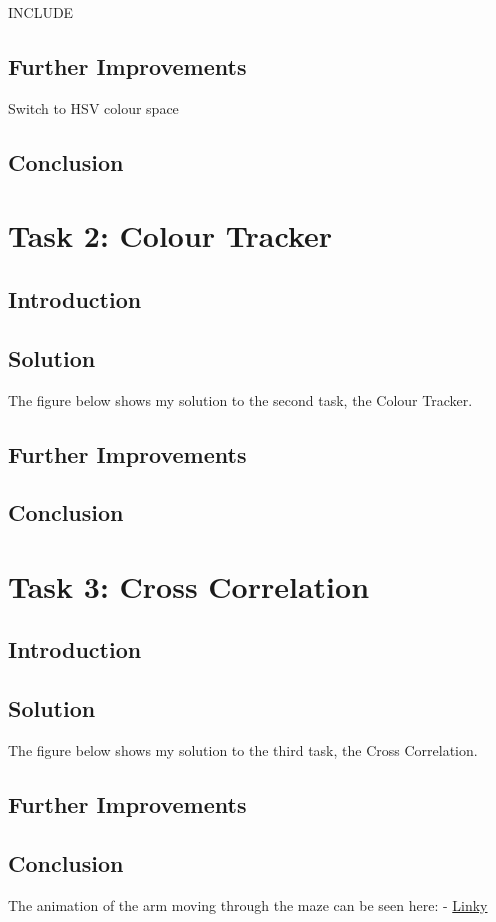 \documentclass[conference]{IEEEtran}
\newcommand{\forceindent}{\leavevmode{\parindent=1em\indent}}
\begin{document}
INCLUDE  

\subsection{Further Improvements}
Switch to HSV colour space

\subsection{Conclusion}

\section{Task 2: Colour Tracker}

\subsection{Introduction}

\subsection{Solution}
\forceindent The figure below shows my solution to the second task, the Colour Tracker. 

\subsection{Further Improvements}

\subsection{Conclusion}

\section{Task 3: Cross Correlation}

\subsection{Introduction}

\subsection{Solution}
\forceindent The figure below shows my solution to the third task, the Cross Correlation. 

\subsection{Further Improvements}

\subsection{Conclusion}

\forceindent The animation of the arm moving through the maze can be seen here: - \href{Link}{Linky}
\end{document}
